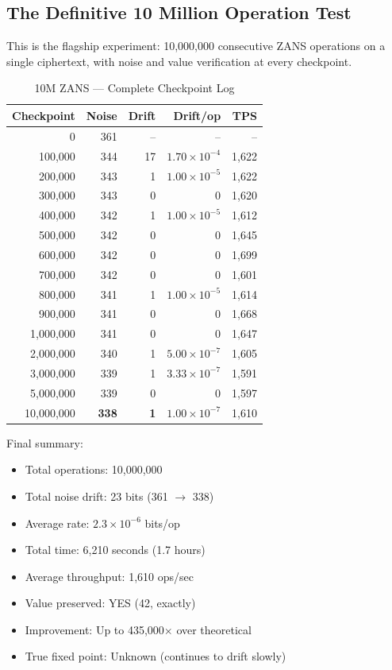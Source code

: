 \documentclass[11pt]{article}
\begin{document}
\subsection{The Definitive 10 Million Operation Test}

This is the flagship experiment: 10,000,000 consecutive ZANS operations on a single ciphertext, with noise and value verification at every checkpoint.

\begin{table}[h]
\centering
\caption{10M ZANS — Complete Checkpoint Log}
\begin{tabular}{r|r|r|r|r}
\textbf{Checkpoint} & \textbf{Noise} & \textbf{Drift} & \textbf{Drift/op} & \textbf{TPS} \\
\hline
0 & 361 & -- & -- & -- \\
100,000 & 344 & 17 & $1.70 \times 10^{-4}$ & 1,622 \\
200,000 & 343 & 1 & $1.00 \times 10^{-5}$ & 1,622 \\
300,000 & 343 & 0 & 0 & 1,620 \\
400,000 & 342 & 1 & $1.00 \times 10^{-5}$ & 1,612 \\
500,000 & 342 & 0 & 0 & 1,645 \\
600,000 & 342 & 0 & 0 & 1,699 \\
700,000 & 342 & 0 & 0 & 1,601 \\
800,000 & 341 & 1 & $1.00 \times 10^{-5}$ & 1,614 \\
900,000 & 341 & 0 & 0 & 1,668 \\
1,000,000 & 341 & 0 & 0 & 1,647 \\
2,000,000 & 340 & 1 & $5.00 \times 10^{-7}$ & 1,605 \\
3,000,000 & 339 & 1 & $3.33 \times 10^{-7}$ & 1,591 \\
5,000,000 & 339 & 0 & 0 & 1,597 \\
10,000,000 & \textbf{338} & \textbf{1} & \textbf{$1.00 \times 10^{-7}$} & 1,610
\end{tabular}
\end{table}

Final summary:
\begin{itemize}
    \item Total operations: 10,000,000
    \item Total noise drift: 23 bits (361 $\to$ 338)
    \item Average rate: $2.3 \times 10^{-6}$ bits/op
    \item Total time: 6,210 seconds (1.7 hours)
    \item Average throughput: 1,610 ops/sec
    \item Value preserved: YES (42, exactly)
    \item Improvement: Up to 435,000$\times$ over theoretical
    \item True fixed point: Unknown (continues to drift slowly)
\end{itemize}
\end{document}
